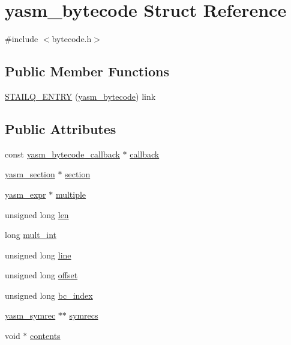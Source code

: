 \hypertarget{structyasm__bytecode}{\section{yasm\-\_\-bytecode Struct Reference}
\label{structyasm__bytecode}
}


{\ttfamily \#include $<$bytecode.\-h$>$}

\subsection*{Public Member Functions}
\begin{DoxyCompactItemize}
\item 
\hyperlink{structyasm__bytecode_a3f2c9f634b4a9f59dc34d6ec58e8b327}{S\-T\-A\-I\-L\-Q\-\_\-\-E\-N\-T\-R\-Y} (\hyperlink{structyasm__bytecode}{yasm\-\_\-bytecode}) link
\end{DoxyCompactItemize}
\subsection*{Public Attributes}
\begin{DoxyCompactItemize}
\item 
const \hyperlink{structyasm__bytecode__callback}{yasm\-\_\-bytecode\-\_\-callback} $\ast$ \hyperlink{structyasm__bytecode_ace189691da8c8737afb7a664cd753fcd}{callback}
\item 
\hyperlink{structyasm__section}{yasm\-\_\-section} $\ast$ \hyperlink{structyasm__bytecode_a08e3d37c6dbd133116c18299622f782e}{section}
\item 
\hyperlink{structyasm__expr}{yasm\-\_\-expr} $\ast$ \hyperlink{structyasm__bytecode_a794e63656319c4ba656b384730535acc}{multiple}
\item 
unsigned long \hyperlink{structyasm__bytecode_aa75a5201d1c9735d144555d277a05d6f}{len}
\item 
long \hyperlink{structyasm__bytecode_ab79d1b67e6451ec3b9d4c0f016e35cc8}{mult\-\_\-int}
\item 
unsigned long \hyperlink{structyasm__bytecode_ac0e7238f4ee5628c88ceedb58c46cd15}{line}
\item 
unsigned long \hyperlink{structyasm__bytecode_ae2a9ef5bc0ec0c1f673ee5ae145b8a97}{offset}
\item 
unsigned long \hyperlink{structyasm__bytecode_a730dd36c4cec9b68bd7e9386abf7ea88}{bc\-\_\-index}
\item 
\hyperlink{structyasm__symrec}{yasm\-\_\-symrec} $\ast$$\ast$ \hyperlink{structyasm__bytecode_a9cd95cb0279e0e9b9354b84e0b2a87d5}{symrecs}
\item 
void $\ast$ \hyperlink{structyasm__bytecode_a00b5eeb6ac2908972964ec3daef631c1}{contents}
\end{DoxyCompactItemize}


